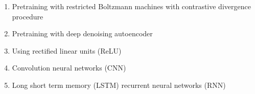 \begin{enumerate}
	\item Pretraining with restricted Boltzmann machines with contrastive divergence procedure \parencite{hinton_fast_2006}
	\item Pretraining with deep denoising autoencoder \parencite{lu_speech_2013}
	\item Using rectified linear units (ReLU) \parencite{zeiler_rectified_2013}
	\item Convolution neural networks (CNN) \parencite{abdel-hamid_applying_2012}
	\item Long short term memory (LSTM) recurrent neural networks (RNN) \parencite{graves_speech_2013}
\end{enumerate}
